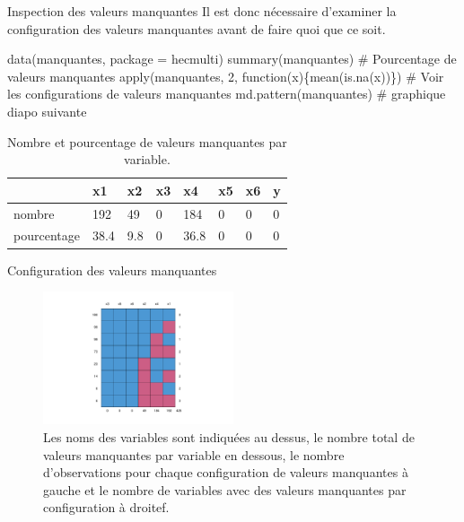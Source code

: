 \documentclass[
  ignorenonframetext,
]{beamer}
\newenvironment{Shaded}{\begin{snugshade}}{\end{snugshade}}
\newcommand{\AttributeTok}[1]{\textcolor[rgb]{0.40,0.45,0.13}{#1}}
\newcommand{\CommentTok}[1]{\textcolor[rgb]{0.37,0.37,0.37}{#1}}
\newcommand{\ControlFlowTok}[1]{\textcolor[rgb]{0.00,0.23,0.31}{#1}}
\newcommand{\DecValTok}[1]{\textcolor[rgb]{0.68,0.00,0.00}{#1}}
\newcommand{\FunctionTok}[1]{\textcolor[rgb]{0.28,0.35,0.67}{#1}}
\newcommand{\NormalTok}[1]{\textcolor[rgb]{0.00,0.23,0.31}{#1}}
\newcommand{\StringTok}[1]{\textcolor[rgb]{0.13,0.47,0.30}{#1}}
\begin{document}
\begin{frame}[fragile]{Inspection des valeurs manquantes}
\protect\hypertarget{inspection-des-valeurs-manquantes}{}
Il est donc nécessaire d'examiner la configuration des valeurs
manquantes avant de faire quoi que ce soit.

\begin{Shaded}
\begin{Highlighting}[numbers=left,,]
\FunctionTok{data}\NormalTok{(manquantes, }\AttributeTok{package =} \StringTok{\textquotesingle{}hecmulti\textquotesingle{}}\NormalTok{)}
\FunctionTok{summary}\NormalTok{(manquantes)}
\CommentTok{\# Pourcentage de valeurs manquantes}
\FunctionTok{apply}\NormalTok{(manquantes, }\DecValTok{2}\NormalTok{, }\ControlFlowTok{function}\NormalTok{(x)\{}\FunctionTok{mean}\NormalTok{(}\FunctionTok{is.na}\NormalTok{(x))\})}
\CommentTok{\# Voir les configurations de valeurs manquantes}
\FunctionTok{md.pattern}\NormalTok{(manquantes) }\CommentTok{\# graphique diapo suivante}
\end{Highlighting}
\end{Shaded}

\hypertarget{tbl-manquantes-univ}{}
\begin{table}
\caption{\label{tbl-manquantes-univ}Nombre et pourcentage de valeurs manquantes par variable. }\tabularnewline

\centering
\begin{tabular}{llllllll}
\toprule
  & x1 & x2 & x3 & x4 & x5 & x6 & y\\
\midrule
nombre & 192 & 49 & 0 & 184 & 0 & 0 & 0\\
pourcentage & 38.4 & 9.8 & 0 & 36.8 & 0 & 0 & 0\\
\bottomrule
\end{tabular}
\end{table}
\end{frame}

\begin{frame}{Configuration des valeurs manquantes}
\protect\hypertarget{configuration-des-valeurs-manquantes}{}
\begin{figure}

{\centering \includegraphics[width=0.5\textwidth,height=\textheight]{MATH60602-diapos7_files/figure-beamer/fig-manquantes2-1.pdf}

}

\caption{\label{fig-manquantes2}Les noms des variables sont indiquées au
dessus, le nombre total de valeurs manquantes par variable en dessous,
le nombre d'observations pour chaque configuration de valeurs manquantes
à gauche et le nombre de variables avec des valeurs manquantes par
configuration à droitef.}

\end{figure}
\end{frame}
\end{document}
